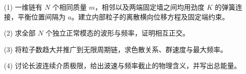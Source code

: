(1) 一维链有 \(N\) 个相同质量 \(m\)，相邻以及两端固定墙之间均用劲度 \(K\) 的弹簧连接，平衡位置间隔为 \(a\)。建立内部粒子的离散横向位移方程及固定端约束。

(2) 求全部 \(N\) 个独立正常模态的波形与频率，证明相互正交。

(3) 将粒子数趋大并推广到无限周期链，求色散关系、群速度与最大频率。

(4) 讨论长波连续介质极限，给出波速与频率截止的物理含义，并写出总能量。
